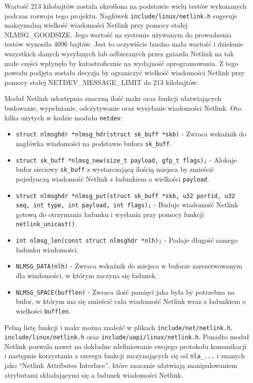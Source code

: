 \documentclass[10pt]{article}
\begin{document}
Wartość 213 kilobajtów została określona na podstawie wielu testów wykonanych podczas rozwoju tego projektu. Nagłówek \texttt{include/linux/netlink.h} sugeruje maksymalną wielkość wiadomości Netlink przy pomocy stałej NLMSG\_GOODSIZE. Jego wartość na systemie używanym do prowadzenia testów wynosiła 4096 bajtów. Jest to oczywiście bardzo mała wartość i dzielenie wszystkich danych wysyłanych lub odbieranych przez gniazda Netlink na tak małe części wpłynęło by katastroficznie na wydajność oprogramowania. Z tego powodu podjęta została decyzja by ograniczyć wielkość wiadomości Netlink przy pomocy stałej NETDEV\_MESSAGE\_LIMIT do 213 kilobajtów.

Moduł Netlink udostępnia znaczną ilość makr oraz funkcji ułatwiających budowanie, wypełnianie, odczytywanie oraz wysyłanie wiadomości Netlink.  Oto kilka użytych w kodzie modułu \texttt{netdev}:

\begin{itemize}
\itemsep1pt\parskip0pt
\item
  \texttt{struct nlmsghdr *nlmsg\_hdr(struct sk\_buff *skb)} - Zwraca wskaźnik do nagłówka wiadomości na podstawie bufora \texttt{sk\_buff}.
\item
  \texttt{struct sk\_buff *nlmsg\_new(size\_t payload, gfp\_t flags);} - Alokuje bufor sieciowy \texttt{sk\_buff} z wystarczającą ilością miejsca by zmieścić pojedynczą wiadomość Netlink z ładunkiem o wielkości \texttt{payload}.
\item
  \texttt{struct nlmsghdr *nlmsg\_put(struct sk\_buff *skb, u32 portid, u32 seq, int type, int payload, int flags);} - Buduje wiadomość Netlink gotową do otrzymania ładunku i wysłania przy pomocy funkcji \texttt{netlink\_unicast()}.
\item
  \texttt{int nlmsg\_len(const struct nlmsghdr *nlh);} - Podaje długość samego ładunku wiadomości.
\item
  \texttt{NLMSG\_DATA(nlh)} - Zwraca wskaźnik do miejsca w buforze zarezerwowanym dla wiadomości, w którym zaczyna się ładunek.
\item
  \texttt{NLMSG\_SPACE(bufflen)} - Zwraca ilość pamięci jaka była by potrzebna na bufor, w którym ma się zmieścić cała wiadomość Netlink wraz z ładunkiem o wielkości \texttt{bufflen}.
\end{itemize}

Pełną listę funkcji i makr można znaleźć w plikach \texttt{include/net/netlink.h}, \texttt{include/linux/netlink.h} oraz \texttt{include/uapi/linux/netlink.h}. Ponadto moduł Netlink pozwala nawet na dokładne zdefiniowanie swojego protokołu komunikacji i następnie korzystania z szeregu funkcji zaczynających się od \texttt{nla\_...} i znanych jako ``Netlink Attributes Interface'', które znacznie ułatwiają manipulowaniem atrybutami składającymi się a ładunek wiadomości Netlink.
\end{document}
